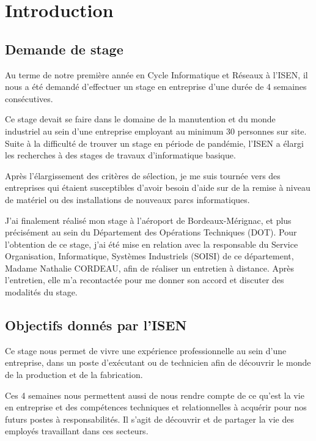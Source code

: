 \chapter{Introduction}


\section{Demande de stage}


Au terme de notre première année en Cycle Informatique et Réseaux à l’ISEN, il nous a été demandé d’effectuer un stage en entreprise d’une durée de 4 semaines consécutives.


Ce stage devait se faire dans le domaine de la manutention et du monde industriel au sein d’une entreprise employant au minimum 30 personnes sur site. Suite à la difficulté de trouver un stage en période de pandémie, l’ISEN a élargi les recherches à des stages de travaux d’informatique basique.\newline


Après l'élargissement des critères de sélection, je me suis tournée vers des entreprises qui étaient susceptibles d'avoir besoin d’aide sur de la remise à niveau de matériel ou des installations de nouveaux parcs informatiques.


J’ai finalement réalisé mon stage à l’aéroport de Bordeaux-Mérignac, et plus précisément au sein du Département des Opérations Techniques (DOT). Pour l’obtention de ce stage, j’ai été mise en relation avec la responsable du Service Organisation, Informatique, Systèmes Industriels (SOISI) de ce département, Madame Nathalie CORDEAU, afin de réaliser un entretien à distance. Après l’entretien, elle m'a recontactée pour me donner son accord et discuter des modalités du stage.


\section{Objectifs donnés par l'ISEN}

Ce stage nous permet de vivre une expérience professionnelle au sein d’une entreprise, dans un poste d’exécutant ou de technicien afin de découvrir le monde de la production et de la fabrication.

Ces 4 semaines nous permettent aussi de nous rendre compte de ce qu'est la vie en entreprise et des compétences techniques et relationnelles à acquérir pour nos futurs postes à responsabilités. Il s'agit de découvrir et de partager la vie des employés travaillant dans ces secteurs.


